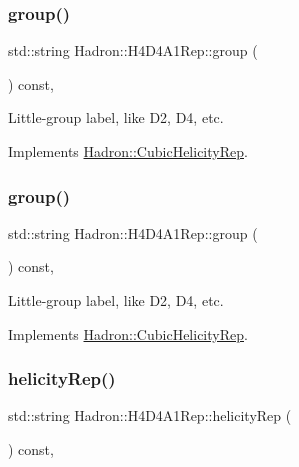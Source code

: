 \subsubsection{\texorpdfstring{group()}{group()}\hspace{0.1cm}{\footnotesize\ttfamily [2/3]}}
{\footnotesize\ttfamily std\+::string Hadron\+::\+H4\+D4\+A1\+Rep\+::group (\begin{DoxyParamCaption}{ }\end{DoxyParamCaption}) const\hspace{0.3cm}{\ttfamily [inline]}, {\ttfamily [virtual]}}

Little-\/group label, like D2, D4, etc. 

Implements \mbox{\hyperlink{structHadron_1_1CubicHelicityRep_a101a7d76cd8ccdad0f272db44b766113}{Hadron\+::\+Cubic\+Helicity\+Rep}}.

\mbox{\label{structHadron_1_1H4D4A1Rep_a3402ac90043c637d96eeafff046ba3ed}} 
\subsubsection{\texorpdfstring{group()}{group()}\hspace{0.1cm}{\footnotesize\ttfamily [3/3]}}
{\footnotesize\ttfamily std\+::string Hadron\+::\+H4\+D4\+A1\+Rep\+::group (\begin{DoxyParamCaption}{ }\end{DoxyParamCaption}) const\hspace{0.3cm}{\ttfamily [inline]}, {\ttfamily [virtual]}}

Little-\/group label, like D2, D4, etc. 

Implements \mbox{\hyperlink{structHadron_1_1CubicHelicityRep_a101a7d76cd8ccdad0f272db44b766113}{Hadron\+::\+Cubic\+Helicity\+Rep}}.

\mbox{\label{structHadron_1_1H4D4A1Rep_a8ac76b2d5ec00ea18a04b62a2a5d20bb}} 
\subsubsection{\texorpdfstring{helicityRep()}{helicityRep()}\hspace{0.1cm}{\footnotesize\ttfamily [1/2]}}
{\footnotesize\ttfamily std\+::string Hadron\+::\+H4\+D4\+A1\+Rep\+::helicity\+Rep (\begin{DoxyParamCaption}{ }\end{DoxyParamCaption}) const\hspace{0.3cm}{\ttfamily [inline]}, {\ttfamily [virtual]}}

